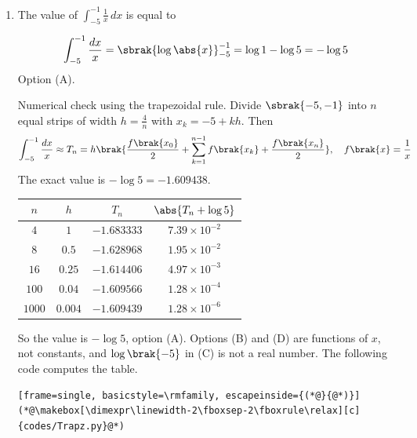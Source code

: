 \begin{enumerate}[label=\thesubsection.\arabic*, ref=\thesubsection.\theenumi]
\item The value of $\displaystyle\int_{-5}^{-1}\frac{1}{x}\,dx$ is equal to
\begin{enumerate}[label=(\Alph*)]
	\begin{multicols}{4}
	\item $-\log 5$
	\item $x^6$
	\item $\log\brak{-5}$
	\item $x^{-6}$
	\end{multicols}
\end{enumerate}
\par\solution
\begin{align}
	\int_{-5}^{-1}\frac{dx}{x} = \sbrak{\log\abs{x}}_{-5}^{-1} = \log 1 - \log 5 = -\log 5
\end{align}
Option (A).

Numerical check using the trapezoidal rule. Divide $\sbrak{-5,-1}$ into $n$ equal strips of width $h = \frac{4}{n}$ with $x_k = -5 + kh$. Then
\begin{align}
	\int_{-5}^{-1}\frac{dx}{x} \approx T_n = h\brak{\frac{f\brak{x_0}}{2} + \sum_{k=1}^{n-1} f\brak{x_k} + \frac{f\brak{x_n}}{2}}, \quad f\brak{x} = \frac{1}{x}
\end{align}
The exact value is $-\log 5 = -1.609438$.
\begin{center}
\begin{tabular}{|c|c|c|c|}
	\hline
	$n$ & $h$ & $T_n$ & $\abs{T_n + \log 5}$ \\
	\hline
	$4$ & $1$ & $-1.683333$ & $7.39\times 10^{-2}$ \\
	$8$ & $0.5$ & $-1.628968$ & $1.95\times 10^{-2}$ \\
	$16$ & $0.25$ & $-1.614406$ & $4.97\times 10^{-3}$ \\
	$100$ & $0.04$ & $-1.609566$ & $1.28\times 10^{-4}$ \\
	$1000$ & $0.004$ & $-1.609439$ & $1.28\times 10^{-6}$ \\
	\hline
\end{tabular}
\end{center}
So the value is $-\log 5$, option (A). Options (B) and (D) are functions of $x$, not constants, and $\log\brak{-5}$ in (C) is not a real number. The following code computes the table.
\begin{lstlisting}[frame=single, basicstyle=\rmfamily, escapeinside={(*@}{@*)}]
(*@\makebox[\dimexpr\linewidth-2\fboxsep-2\fboxrule\relax][c]{codes/Trapz.py}@*)
\end{lstlisting}


\end{enumerate}
